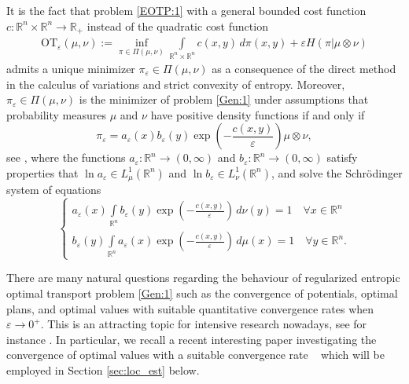 \documentclass[reqno,12pt]{article}
\newcommand{\R}{\mathbb{R}}
\newcommand{\I}{\int\limits}
\begin{document}
It is the fact that problem \eqref{EOTP:1} with a general bounded cost function $c : \R^{n}\times \R^{n} \rightarrow \R_{+}$ instead of the quadratic cost function 
\begin{align}
    \label{Gen:1}
    \text{OT}_{\varepsilon}(\mu,\nu):= \inf\limits_{\pi \in \Pi(\mu,\nu)}\I_{\R^{n}\times \R^{n}} c(x,y)\,d\pi(x,y) + 
    \varepsilon H(\pi | \mu\otimes \nu) 
\end{align}
admits a unique minimizer   $\pi_{\varepsilon}\in \Pi(\mu,\nu)$ as a consequence of the direct method in the calculus of variations and strict convexity of entropy. Moreover, $\pi_{\varepsilon}\in \Pi(\mu,\nu)$ is the minimizer of problem \eqref{Gen:1} under assumptions that probability measures $\mu$ and $\nu$ have positive density functions if and only if
\begin{equation*}
    \pi_{\varepsilon} = a_{\varepsilon}(x)b_{\varepsilon}(y)\exp\left(-\frac{c(x,y)}{\varepsilon}\right)\mu\otimes \nu,
\end{equation*}
see \cite{BorLewNus94, leonard2014}, where  the functions $a_{\varepsilon} : \R^{n}\rightarrow (0,\infty)$ and $  b_{\varepsilon} : \R^{n}\rightarrow (0,\infty)$ satisfy properties that $\ln a_{\varepsilon} \in L_{\mu}^{1}(\R^{n})$ and $\ln b_{\varepsilon}\in L_{\nu}^{1}(\R^{n})$, and solve the Schr\"odinger system of equations
\begin{equation*}
    \begin{cases}
        \displaystyle a_{\varepsilon}(x)\I_{\R^{n}}b_{\varepsilon}(y)\exp\left( -\frac{c(x,y)}{\varepsilon}\right)\,d\nu(y) = 1\quad \forall x\in \R^{n} \\
        \displaystyle b_{\varepsilon}(y)\I_{\R^{n}}a_{\varepsilon}(x)\exp\left( -\frac{c(x,y)}{\varepsilon}\right)\,d\mu(x) = 1 \quad \forall y\in \R^{n}.
    \end{cases}
\end{equation*}

There are many natural questions regarding the behaviour of regularized entropic optimal transport problem \eqref{Gen:1} such as the convergence of potentials, optimal plans, and optimal values with suitable quantitative convergence rates  when $\varepsilon\rightarrow 0^{+}$. This is an attracting topic for intensive research nowadays, see for instance \cite{CarDuvPeySch17,DG20,LeoGamma,Mik04}. In particular, we recall a recent interesting paper investigating the convergence of optimal values with a suitable convergence rate ~\cite[Theorem 1.1]{CPT23} which will be employed in Section \ref{sec:loc_est} below.
\end{document}
